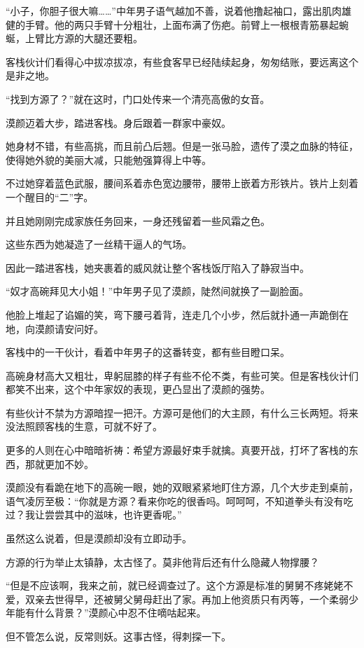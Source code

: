 \begin{this_body}
“小子，你胆子很大嘛……”中年男子语气越加不善，说着他撸起袖口，露出肌肉雄健的手臂。他的两只手臂十分粗壮，上面布满了伤疤。前臂上一根根青筋暴起蜿蜒，上臂比方源的大腿还要粗。

客栈伙计们看得心中拔凉拔凉，有些食客早已经陆续起身，匆匆结账，要远离这个是非之地。

“找到方源了？”就在这时，门口处传来一个清亮高傲的女音。

漠颜迈着大步，踏进客栈。身后跟着一群家中豪奴。

她身材不错，有些高挑，而且前凸后翘。但是一张马脸，遗传了漠之血脉的特征，使得她外貌的美丽大减，只能勉强算得上中等。

不过她穿着蓝色武服，腰间系着赤色宽边腰带，腰带上嵌着方形铁片。铁片上刻着一个醒目的“二”字。

并且她刚刚完成家族任务回来，一身还残留着一些风霜之色。

这些东西为她凝造了一丝精干逼人的气场。

因此一踏进客栈，她夹裹着的威风就让整个客栈饭厅陷入了静寂当中。

“奴才高碗拜见大小姐！”中年男子见了漠颜，陡然间就换了一副脸面。

他脸上堆起了谄媚的笑，弯下腰弓着背，连走几个小步，然后就扑通一声跪倒在地，向漠颜请安问好。

客栈中的一干伙计，看着中年男子的这番转变，都有些目瞪口呆。

高碗身材高大又粗壮，卑躬屈膝的样子有些不伦不类，有些可笑。但是客栈伙计们都笑不出来，这个中年家奴的表现，更凸显出了漠颜的强势。

有些伙计不禁为方源暗捏一把汗。方源可是他们的大主顾，有什么三长两短。将来没法照顾客栈的生意，可就不好了。

更多的人则在心中暗暗祈祷：希望方源最好束手就擒。真要开战，打坏了客栈的东西，那就更加不妙。

漠颜没有看跪在地下的高碗一眼，她的双眼紧紧地盯住方源，几个大步走到桌前，语气凌厉至极：“你就是方源？看来你吃的很香吗。呵呵呵，不知道拳头有没有吃过？我让尝尝其中的滋味，也许更香呢。”

虽然这么说着，但是漠颜却没有立即动手。

方源的行为举止太镇静，太古怪了。莫非他背后还有什么隐藏人物撑腰？

“但是不应该啊，我来之前，就已经调查过了。这个方源是标准的舅舅不疼姥姥不爱，双亲去世得早，还被舅父舅母赶出了家。再加上他资质只有丙等，一个柔弱少年能有什么背景？”漠颜心中忍不住嘀咕起来。

但不管怎么说，反常则妖。这事古怪，得刺探一下。


\end{this_body}
